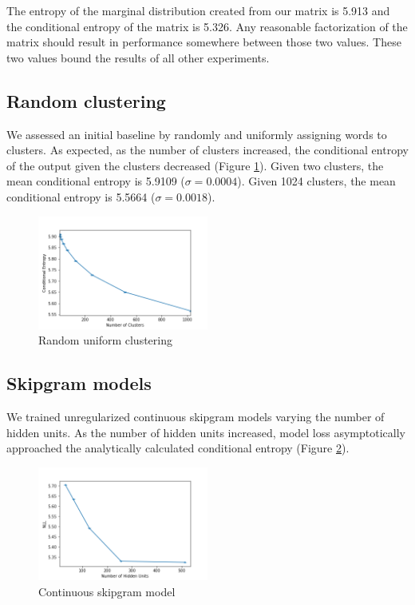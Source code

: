 \documentclass[11pt,letterpaper]{article}
\begin{document}
The entropy of the marginal distribution created from our matrix is 5.913 and the conditional entropy of the matrix is 5.326. Any reasonable factorization of the matrix should result in performance somewhere between those two values. These two values bound the results of all other experiments.

\subsection{Random clustering}

We assessed an initial baseline by randomly and uniformly assigning words to clusters. As expected, as the number of clusters increased, the conditional entropy of the output given the clusters decreased (Figure \ref{f:random}). Given two clusters, the mean conditional entropy is 5.9109 ($\sigma=0.0004$). Given 1024 clusters, the mean conditional entropy is 5.5664 ($\sigma=0.0018$).

\begin{figure}
  \caption{Random uniform clustering}
\label{f:random}
  \centering
    \includegraphics[width=0.5\textwidth]{random.png}
\end{figure}

\subsection{Skipgram models}

We trained unregularized continuous skipgram models varying the number of hidden units. As the number of hidden units increased, model loss asymptotically approached the analytically calculated conditional entropy (Figure \ref{f:baseline}). 

\begin{figure}
  \caption{Continuous skipgram model}
\label{f:baseline}
  \centering
    \includegraphics[width=0.5\textwidth]{baseline.png}
\end{figure}
\end{document}
